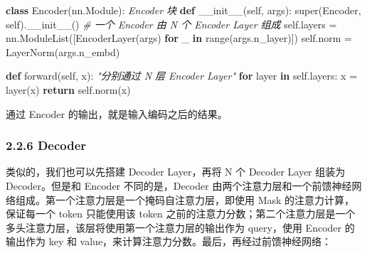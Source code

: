 \documentclass[
]{article}
\newenvironment{Shaded}{}{}
\newcommand{\BuiltInTok}[1]{\textcolor[rgb]{0.00,0.50,0.00}{#1}}
\newcommand{\CommentTok}[1]{\textcolor[rgb]{0.38,0.63,0.69}{\textit{#1}}}
\newcommand{\ControlFlowTok}[1]{\textcolor[rgb]{0.00,0.44,0.13}{\textbf{#1}}}
\newcommand{\FunctionTok}[1]{\textcolor[rgb]{0.02,0.16,0.49}{#1}}
\newcommand{\KeywordTok}[1]{\textcolor[rgb]{0.00,0.44,0.13}{\textbf{#1}}}
\newcommand{\NormalTok}[1]{#1}
\newcommand{\OperatorTok}[1]{\textcolor[rgb]{0.40,0.40,0.40}{#1}}
\newcommand{\VariableTok}[1]{\textcolor[rgb]{0.10,0.09,0.49}{#1}}
\begin{document}
\begin{Shaded}
\begin{Highlighting}[]
\KeywordTok{class}\NormalTok{ Encoder(nn.Module):}
    \CommentTok{\textquotesingle{}\textquotesingle{}\textquotesingle{}Encoder 块\textquotesingle{}\textquotesingle{}\textquotesingle{}}
    \KeywordTok{def} \FunctionTok{\_\_init\_\_}\NormalTok{(}\VariableTok{self}\NormalTok{, args):}
        \BuiltInTok{super}\NormalTok{(Encoder, }\VariableTok{self}\NormalTok{).}\FunctionTok{\_\_init\_\_}\NormalTok{() }
        \CommentTok{\# 一个 Encoder 由 N 个 Encoder Layer 组成}
        \VariableTok{self}\NormalTok{.layers }\OperatorTok{=}\NormalTok{ nn.ModuleList([EncoderLayer(args) }\ControlFlowTok{for}\NormalTok{ \_ }\KeywordTok{in} \BuiltInTok{range}\NormalTok{(args.n\_layer)])}
        \VariableTok{self}\NormalTok{.norm }\OperatorTok{=}\NormalTok{ LayerNorm(args.n\_embd)}

    \KeywordTok{def}\NormalTok{ forward(}\VariableTok{self}\NormalTok{, x):}
        \CommentTok{"分别通过 N 层 Encoder Layer"}
        \ControlFlowTok{for}\NormalTok{ layer }\KeywordTok{in} \VariableTok{self}\NormalTok{.layers:}
\NormalTok{            x }\OperatorTok{=}\NormalTok{ layer(x)}
        \ControlFlowTok{return} \VariableTok{self}\NormalTok{.norm(x)}
\end{Highlighting}
\end{Shaded}

通过 Encoder 的输出，就是输入编码之后的结果。

\subsubsection{2.2.6 Decoder}\label{decoder}

类似的，我们也可以先搭建 Decoder Layer，再将 N 个 Decoder Layer 组装为
Decoder。但是和 Encoder 不同的是，Decoder
由两个注意力层和一个前馈神经网络组成。第一个注意力层是一个掩码自注意力层，即使用
Mask 的注意力计算，保证每一个 token 只能使用该 token
之前的注意力分数；第二个注意力层是一个多头注意力层，该层将使用第一个注意力层的输出作为
query，使用 Encoder 的输出作为 key 和
value，来计算注意力分数。最后，再经过前馈神经网络：
\end{document}
